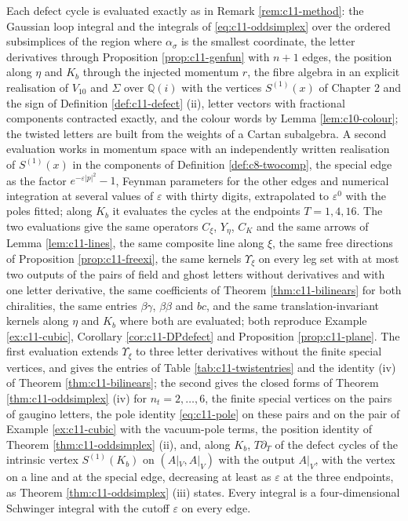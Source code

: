 \begin{remark}
\label{rem:c11-oddmethod}
Each defect cycle is evaluated exactly as in Remark \ref{rem:c11-method}: the Gaussian loop integral and the integrals of \eqref{eq:c11-oddsimplex} over the ordered subsimplices of the region where $\alpha_\sigma$ is the smallest coordinate, the letter derivatives through Proposition \ref{prop:c11-genfun} with $n+1$ edges, the position along $\eta$ and $K_b$ through the injected momentum $r$, the fibre algebra in an explicit realisation of $V_{10}$ and $\Sigma$ over $\mathbb Q(i)$ with the vertices $S^{(1)}(x)$ of Chapter 2 and the sign of Definition \ref{def:c11-defect} (ii), letter vectors with fractional components contracted exactly, and the colour words by Lemma \ref{lem:c10-colour}; the twisted letters are built from the weights of a Cartan subalgebra. A second evaluation works in momentum space with an independently written realisation of $S^{(1)}(x)$ in the components of Definition \ref{def:c8-twocomp}, the special edge as the factor $e^{-\varepsilon|p|^2}-1$, Feynman parameters for the other edges and numerical integration at several values of $\varepsilon$ with thirty digits, extrapolated to $\varepsilon^0$ with the poles fitted; along $K_b$ it evaluates the cycles at the endpoints $T=1,4,16$. The two evaluations give the same operators $C_\xi$, $Y_\eta$, $C_K$ and the same arrows of Lemma \ref{lem:c11-lines}, the same composite line along $\xi$, the same free directions of Proposition \ref{prop:c11-freexi}, the same kernels $\Upsilon_\xi$ on every leg set with at most two outputs of the pairs of field and ghost letters without derivatives and with one letter derivative, the same coefficients of Theorem \ref{thm:c11-bilinears} for both chiralities, the same entries $\beta\gamma$, $\beta\beta$ and $bc$, and the same translation-invariant kernels along $\eta$ and $K_b$ where both are evaluated; both reproduce Example \ref{ex:c11-cubic}, Corollary \ref{cor:c11-DPdefect} and Proposition \ref{prop:c11-plane}. The first evaluation extends $\Upsilon_\xi$ to three letter derivatives without the finite special vertices, and gives the entries of Table \ref{tab:c11-twistentries} and the identity (iv) of Theorem \ref{thm:c11-bilinears}; the second gives the closed forms of Theorem \ref{thm:c11-oddsimplex} (iv) for $n_t=2,\dots,6$, the finite special vertices on the pairs of gaugino letters, the pole identity \eqref{eq:c11-pole} on these pairs and on the pair of Example \ref{ex:c11-cubic} with the vacuum-pole terms, the position identity of Theorem \ref{thm:c11-oddsimplex} (ii), and, along $K_b$, $T\partial_T$ of the defect cycles of the intrinsic vertex $S^{(1)}(K_b)$ on $(A|_V,A|_V)$ with the output $A|_V$, with the vertex on a line and at the special edge, decreasing at least as $\varepsilon$ at the three endpoints, as Theorem \ref{thm:c11-oddsimplex} (iii) states. Every integral is a four-dimensional Schwinger integral with the cutoff $\varepsilon$ on every edge.
\end{remark}

